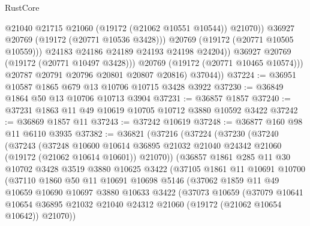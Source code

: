 \begin{lexlean}{RustCore}
\begin{coremodule}
                          @21040
                          @21715
                          @21060
                          (@19172 (@21062 @10551 @10544))
                          @21070))
                      @36927
                      @20769
                      (@19172 (@20771 @10536 @3428)))
                    @20769
                    (@19172 (@20771 @10505 @10559)))
                  @24183
                  @24186
                  @24189
                  @24193
                  @24198
                  @24204))
              @36927
              @20769
              (@19172 (@20771 @10497 @3428)))
            @20769
            (@19172 (@20771 @10465 @10574)))
          @20787
          @20791
          @20796
          @20801
          @20807
          @20816)
        @37044))
@37224 := @36951 @10587 @1865 @679 @13 @10706 @10715 @3428 @3922
@37230 := @36849 @1864 @50 @13 @10706 @10713 @3904
@37231 := @36857 @1857
@37240 := @37231 @1863 @11 @49 @10619 @10705 @10712 @3880 @10592 @3422
@37242 := @36869 @1857 @11
@37243 := @37242 @10619
@37248 := @36877 @160 @98 @11 @6110 @3935
@37382 := @36821
    (@37216
      (@37224
        (@37230
          (@37240
            (@37243
              (@37248
                @10600
                @10614
                @36895
                @21032
                @21040
                @24342
                @21060
                (@19172 (@21062 @10614 @10601))
                @21070))
            (@36857
              @1861
              @285
              @11
              @30
              @10702
              @3428
              @3519
              @3880
              @10625
              @3422
              (@37105
                @1861
                @11
                @10691
                @10700
                (@37110
                  @1860
                  @50
                  @11
                  @10691
                  @10698
                  @5146
                  (@37062
                    @1859
                    @11
                    @49
                    @10659
                    @10690
                    @10697
                    @3880
                    @10633
                    @3422
                    (@37073
                      @10659
                      (@37079
                        @10641
                        @10654
                        @36895
                        @21032
                        @21040
                        @24312
                        @21060
                        (@19172 (@21062 @10654 @10642))
                        @21070))

\end{coremodule}
\end{lexlean}
